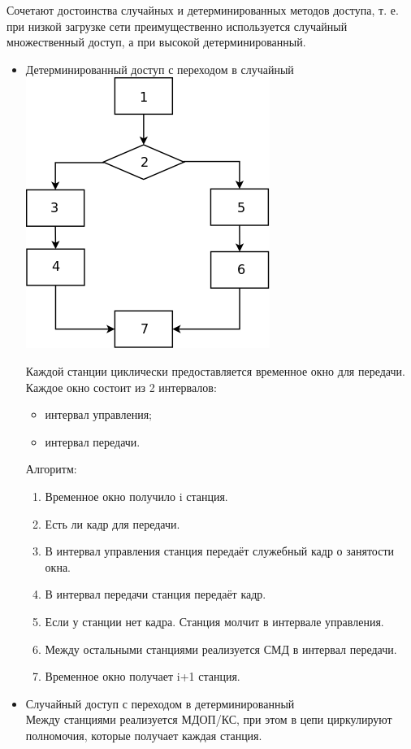 \documentclass[12pt, russian, oneside, article]{ncc}
\begin{document}
Сочетают достоинства случайных и детерминированных методов доступа, т. е. при низкой загрузке сети преимущественно используется случайный множественный доступ, а при высокой детерминированный.
\begin{itemize}

\item Детерминированный доступ с переходом в случайный\\
\label{sec-5_1_3_1}%
\includegraphics[]{images/SiSPI/ds.png}

Каждой станции циклически предоставляется временное окно для передачи. Каждое окно состоит из 2 интервалов:
\begin{itemize}
\item интервал управления;
\item интервал передачи.
\end{itemize}

Алгоритм:
\begin{enumerate}
\item Временное окно получило i станция.
\item Есть ли кадр для передачи.
\item В интервал управления станция передаёт служебный кадр о занятости окна.
\item В интервал передачи станция передаёт кадр.
\item Если у станции нет кадра. Станция молчит в интервале управления.
\item Между остальными станциями реализуется СМД в интервал передачи.
\item Временное окно получает i+1 станция.
\end{enumerate}


\item Случайный доступ с переходом в детерминированный\\
\label{sec-5_1_3_2}%
Между станциями реализуется МДОП/КС, при этом в цепи циркулируют полномочия, которые получает каждая станция.


\end{itemize}
\end{document}

